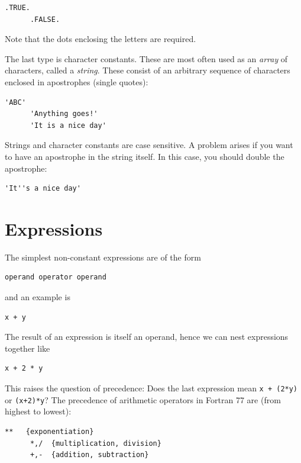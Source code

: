 \begin{lstlisting}[style=fortran77]
      .TRUE.
      .FALSE.
\end{lstlisting}

Note that the dots enclosing the letters are required.

The last type is character constants. These are most often used as an \emph{array} of characters, called a \emph{string}. These consist of an arbitrary sequence of characters enclosed in apostrophes (single quotes):

\begin{lstlisting}[style=fortran77]
      'ABC'
      'Anything goes!'
      'It is a nice day'
\end{lstlisting}

Strings and character constants are case sensitive. A problem arises if you want to have an apostrophe in the string itself. In this case, you should double the apostrophe:

\begin{lstlisting}[style=fortran77]
      'It''s a nice day'
\end{lstlisting}

\section{Expressions}

The simplest non-constant expressions are of the form

\begin{lstlisting}[style=fortran77]
      operand operator operand
\end{lstlisting}

and an example is

\begin{lstlisting}[style=fortran77]
      x + y
\end{lstlisting}

The result of an expression is itself an operand, hence we can nest expressions together like

\begin{lstlisting}[style=fortran77]
      x + 2 * y 
\end{lstlisting}

This raises the question of precedence: Does the last expression mean \texttt{x + (2*y)} or \texttt{(x+2)*y}? The precedence of arithmetic operators in Fortran 77 are (from highest to lowest):

\begin{lstlisting}[style=fortran77]
      **   {exponentiation}
      *,/  {multiplication, division}
      +,-  {addition, subtraction}
\end{lstlisting}

